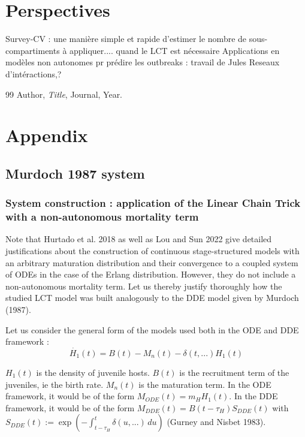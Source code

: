 \documentclass[12pt,a4paper,onecolumn]{article}
\newcommand{\noPageNumber}{\thispagestyle{empty}}
\begin{document}
\section{Perspectives}
Survey-CV : une manière simple et rapide d'estimer le nombre de sous-compartiments à appliquer.... quand le LCT est nécessaire 
Applications en modèles non autonomes pr prédire les outbreaks : travail de Jules
Reseaux d'intéractions,?

\newpage
\noPageNumber
\begin{thebibliography}{99}
 Author, \emph{Title}, Journal, Year.
\end{thebibliography}

\newpage
\noPageNumber
\appendix
\section{Appendix}

\subsection{Murdoch 1987 system}
\subsubsection{System construction : application of the Linear Chain Trick with a non-autonomous mortality term}
Note that Hurtado et al. 2018 as well as Lou and Sun 2022 give detailed justifications about the construction of continuous stage-structured models with an arbitrary maturation distribution and their convergence to a coupled system of ODEs in the case of the Erlang distribution. However, they do not include a non-autonomous mortality term. Let us thereby justify thoroughly how the studied LCT model was built analogously to the DDE model given by Murdoch (1987).

Let us consider the general form of the models used both in the ODE and DDE framework :  
\begin{equation}
\dot{H_{1}}(t) = B(t) - M_n(t) - \delta(t, ...) H_1(t)
\end{equation}

$H_1(t)$ is the density of juvenile hosts. $B(t)$ is the recruitment term of the juveniles, ie the birth rate. $M_n(t)$ is the maturation term. In the ODE framework, it would be of the form $M_{ODE}(t)= m_H H_1(t)$. In the DDE framework, it would be of the form $M_{DDE}(t) = B(t-\tau_H)S_{DDE}(t)$ with $S_{DDE}(t) := \exp\left( -\int_{t-\tau_H}^{t} \delta(u, ...) \, du \right)$ (Gurney and Nisbet 1983). 
\end{document}

